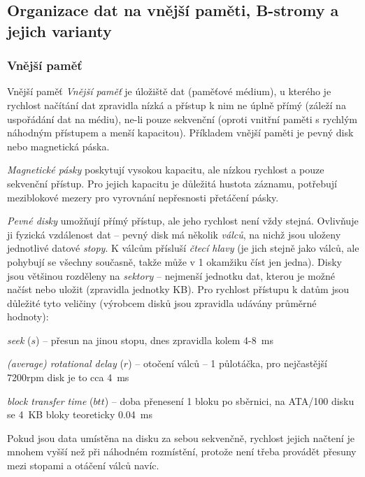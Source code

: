 
\subsection{Organizace dat na vnější paměti, B-stromy a jejich varianty}


\subsubsection*{Vnější paměť}

\begin{definiceN}{Vnější paměť}
\emph{Vnější paměť} je úložiště dat (paměťové médium), u kterého je rychlost načítání dat zpravidla nízká a přístup k nim ne úplně přímý (záleží na uspořádání dat na médiu), ne-li pouze sekvenční (oproti vnitřní paměti s rychlým náhodným přístupem a menší kapacitou). Příkladem vnější paměti je pevný disk nebo magnetická páska.

\emph{Magnetické pásky} poskytují vysokou kapacitu, ale nízkou rychlost a pouze sekvenční přístup. Pro jejich kapacitu je důležitá hustota záznamu, potřebují meziblokové mezery pro vyrovnání nepřesnosti přetáčení pásky.

\emph{Pevné disky} umožňují přímý přístup, ale jeho rychlost není vždy stejná. Ovlivňuje ji fyzická vzdálenost dat -- pevný disk má několik \emph{válců}, na nichž jsou uloženy jednotlivé datové \emph{stopy}. K válcům přísluší \emph{čtecí hlavy} (je jich stejně jako válců, ale pohybují se všechny současně, takže může v 1 okamžiku číst jen jedna). Disky jsou většinou rozděleny na \emph{sektory} -- nejmenší jednotku dat, kterou je možné načíst nebo uložit (zpravidla jednotky KB). Pro rychlost přístupu k datům jsou důležité tyto veličiny (výrobcem disků jsou zpravidla udávány průměrné hodnoty):
\begin{pitemize}
    \item \emph{seek} ($s$) -- přesun na jinou stopu, dnes zpravidla kolem 4-8~ms
    \item \emph{(average) rotational delay} ($r$) -- otočení válců -- 1 půlotáčka, pro nejčastější 7200rpm disk je to cca 4~ms
    \item \emph{block transfer time} ($btt$) -- doba přenesení 1 bloku po sběrnici, na ATA/100 disku se 4~KB bloky teoreticky 0.04~ms
\end{pitemize}
Pokud jsou data umístěna na disku za sebou sekvenčně, rychlost jejich načtení je mnohem vyšší než při náhodném rozmístění, protože není třeba provádět přesuny mezi stopami a otáčení válců navíc.
\end{definiceN}


